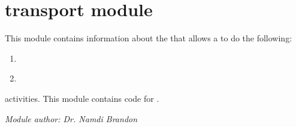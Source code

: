 \documentclass[letterpaper,10pt,english]{sphinxmanual}
\begin{document}
\section{transport module}
\label{transport::doc}\label{transport:module-transport}\label{transport:transport-module}
This module contains information about the {\hyperref[asset:asset.Asset]{\emph{}}} that allows a {\hyperref[person:person.Person]{\emph{}}} to do the following:
\begin{enumerate}
\item {} 
{\hyperref[commute:commute.Commute_To_Work]{\emph{}}}

\item {} 
{\hyperref[commute:commute.Commute_From_Work]{\emph{}}}

\end{enumerate}

activities. This module contains code for {\hyperref[transport:transport.Transport]{\emph{}}}.

\emph{Module author: Dr. Namdi Brandon}
\end{document}
